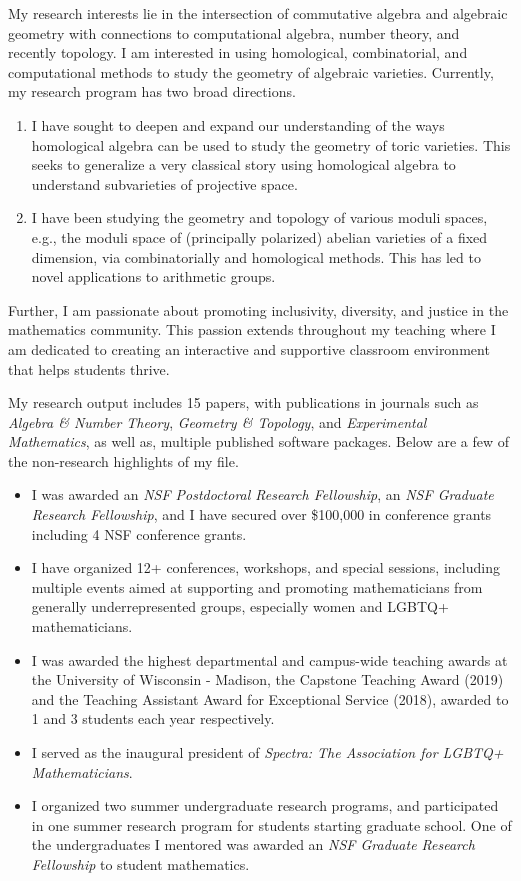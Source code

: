 \documentclass[11pt]{article}
\begin{document}
My research interests lie in the intersection of commutative algebra and algebraic geometry with connections to computational algebra, number theory, and recently topology. I am interested in using homological, combinatorial, and computational methods to study the geometry of algebraic varieties. Currently, my research program has two broad directions.
\begin{enumerate}[leftmargin=*,label=(\roman*)]
\item I have sought to deepen and expand our understanding of the ways homological algebra can be used to study the geometry of toric varieties. This seeks to generalize a very classical story using homological algebra to understand subvarieties of projective space.
\item I have been studying the geometry and topology of various moduli spaces, e.g., the moduli space of (principally polarized) abelian varieties of a fixed dimension, via combinatorially and homological methods. This has led to novel applications to arithmetic groups. 
\end{enumerate}
Further, I am passionate about promoting inclusivity, diversity, and justice in the mathematics community. This passion extends throughout my teaching where I am dedicated to creating an interactive and supportive classroom environment that helps students thrive. 

My research output includes 15 papers, with publications in journals such as \textit{Algebra \& Number Theory}, \textit{Geometry \& Topology}, and \textit{Experimental Mathematics}, as well as, multiple published software packages. Below are a few of the non-research highlights of my file.

\begin{itemize}[leftmargin=*]
\item I was awarded an \textit{NSF Postdoctoral Research Fellowship}, an \textit{NSF Graduate Research Fellowship}, and I have secured over \$100,000 in conference grants including 4 NSF conference grants. 
\item I have organized 12+ conferences, workshops, and special sessions, including multiple events aimed at supporting and promoting mathematicians from generally underrepresented groups, especially women and LGBTQ+ mathematicians. 
\item I was awarded the highest departmental and campus-wide teaching awards at the University of Wisconsin - Madison, the Capstone Teaching Award (2019) and the Teaching Assistant Award for Exceptional Service (2018), awarded to 1 and 3 students each year respectively. 
\item I served as the inaugural president of \textit{Spectra: The Association for LGBTQ+ Mathematicians}.
\item I organized two summer undergraduate research programs, and participated in one summer research program for students starting graduate school. One of the undergraduates I mentored was awarded an \textit{NSF Graduate Research Fellowship} to student mathematics.  
\end{itemize}
\end{document}
